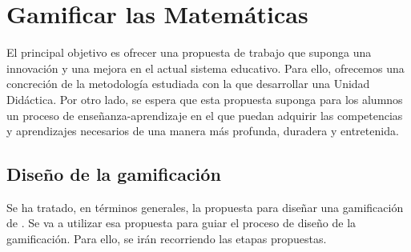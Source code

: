 
\newcommand{\arab}{al-Karaji}
\newcommand{\Arab}{Al-Karaji}
\newcommand{\logro}[2]{\labeltext{#1\xspace}{logro::#2} #1\xspace}


\chapter{Gamificar las Matemáticas}




El principal objetivo es ofrecer una propuesta de trabajo que suponga una innovación y una mejora en el actual sistema educativo.
%
Para ello, ofrecemos una concreción de la metodología estudiada con la que desarrollar una Unidad Didáctica.
% 
Por otro lado, se espera que esta propuesta suponga para los alumnos un proceso de enseñanza-aprendizaje en el que puedan adquirir las competencias y aprendizajes necesarios de una manera más profunda, duradera y entretenida.


\section{Diseño de la gamificación}

Se ha tratado, en términos generales, la propuesta para diseñar una gamificación de \cite{kapp2013gamification}. 
%
Se va a utilizar esa propuesta para guiar el proceso de diseño de la gamificación. 
%
Para ello, se irán recorriendo las etapas propuestas.

